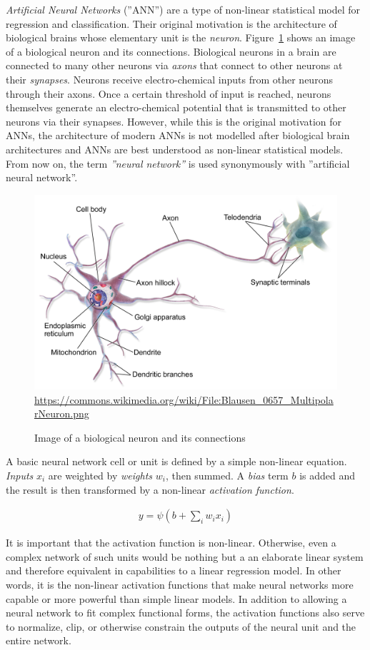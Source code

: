 \emph{Artificial Neural Networks} (''ANN'') are a type of non-linear statistical model for regression and classification. Their original motivation is the architecture of biological brains whose elementary unit is the \emph{neuron}. Figure~\ref{fig:neuron} shows an image of a biological neuron and its connections. Biological neurons in a brain are connected to many other neurons via \emph{axons} that connect to other neurons at their \emph{synapses}. Neurons receive electro-chemical inputs from other neurons through their axons. Once a certain threshold of input is reached, neurons themselves generate an electro-chemical potential that is transmitted to other neurons via their synapses. However, while this is the original motivation for ANNs, the architecture of modern ANNs is not modelled after biological brain architectures and ANNs are best understood as non-linear statistical models. From now on, the term \emph{''neural network''} is used synonymously with ''artificial neural network''.

\begin{figure}
\centering
\includegraphics[width=.7\textwidth]{Blausen_0657_MultipolarNeuron.png}
\scriptsize \url{https://commons.wikimedia.org/wiki/File:Blausen_0657_MultipolarNeuron.png}
\caption{Image of a biological neuron and its connections}
\label{fig:neuron}
\end{figure}

A basic neural network cell or unit is defined by a simple non-linear equation. \emph{Inputs} $x_i$ are weighted by \emph{weights} $w_i$, then summed. A \emph{bias} term $b$ is added and the result is then transformed by a non-linear \emph{activation function}.

\begin{align}
y = \psi( b + \sum_i w_i x_i ) \label{eq:neuron}
\end{align}

It is important that the activation function is non-linear. Otherwise, even a complex network of such units would be nothing but a an elaborate linear system and therefore equivalent in capabilities to a linear regression model. In other words, it is the non-linear activation functions that make neural networks more capable or more powerful than simple linear models. In addition to allowing a neural network to fit complex functional forms, the activation functions also serve to normalize, clip, or otherwise constrain the outputs of the neural unit and the entire network.

